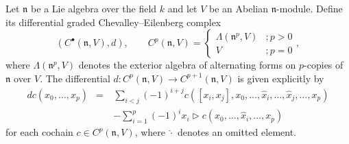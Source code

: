 \documentclass[onecolumn]{article}
\theoremstyle{theorem}
\theoremstyle{remark}
\theoremstyle{example}
\theoremstyle{definition}
\numberwithin{equation}{section}
\begin{document}
Let $\mathfrak{n}$ be a Lie algebra over the field $k$ and let $V$ be an Abelian $\mathfrak{n}$-module. Define its differential graded { {Chevalley--Eilenberg complex}} 
\begin{equation}
    (C^\bullet(\mathfrak{n},V),d),\qquad C^p(\mathfrak{n},V) = \begin{cases} \Lambda(\mathfrak{n}^p,V) &; p>0 \\ V &; p=0\end{cases},\nonumber
\end{equation}
where $\Lambda(\mathfrak{n}^p,V)$ denotes the exterior algebra of alternating forms on $p$-copies of $\mathfrak{n}$ over $V$. The differential $d:C^p(\mathfrak{n},V)\rightarrow C^{p+1}(\mathfrak{n},V)$ is given explicitly by
\begin{eqnarray}
    dc(x_0,\dots,x_p) &=& \sum_{i<j}(-1)^{i+j}c([x_i,x_j],x_0,\dots,\hat{x}_i,\dots,\hat{x}_j,\dots,x_p)\nonumber \\
    &\quad& - \sum_{i=1}^p(-1)^ix_i\rhd c(x_0,\dots,\hat{x}_i,\dots,x_p)\nonumber
\end{eqnarray}
for each cochain $c\in C^p(\mathfrak{n},V)$, where $\hat{\cdot}$ denotes an omitted element.
\end{document}
